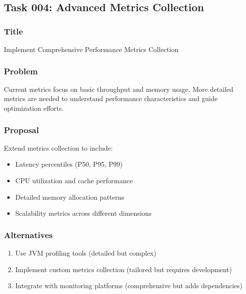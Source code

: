 \documentclass[11pt,a4paper]{article}
\begin{document}

\subsection{Task 004: Advanced Metrics Collection}

\subsubsection{Title}
Implement Comprehensive Performance Metrics Collection

\subsubsection{Problem}
Current metrics focus on basic throughput and memory usage. More detailed metrics are needed to understand performance characteristics and guide optimization efforts.

\subsubsection{Proposal}
Extend metrics collection to include:
\begin{itemize}
    \item Latency percentiles (P50, P95, P99)
    \item CPU utilization and cache performance
    \item Detailed memory allocation patterns
    \item Scalability metrics across different dimensions
\end{itemize}

\subsubsection{Alternatives}
\begin{enumerate}
    \item Use JVM profiling tools (detailed but complex)
    \item Implement custom metrics collection (tailored but requires development)
    \item Integrate with monitoring platforms (comprehensive but adds dependencies)
\end{enumerate}
\end{document}
